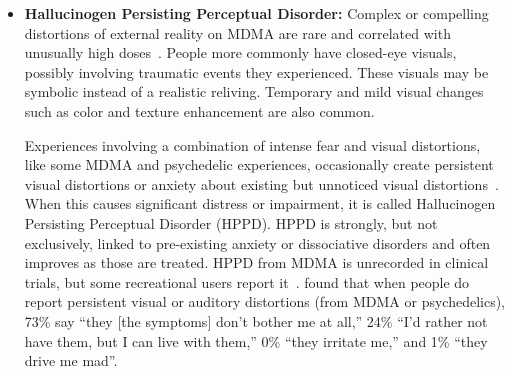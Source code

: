 \documentclass[11pt,oneside]{book}
\let\cite\parencite
\begin{document}
\begin{itemize}
    This suggests that the addictive potential of MDMA therapy is minimal for most people. If you are particularly worried about your potential for addiction or have significantly impaired impulse control, I suggest only doing MDMA therapy in structured, practitioner guided contexts. This might include people who have, or are in remission from, serious amphetamine or cocaine addictions who might find the stimulant effects of MDMA close enough to the effects of their abused drug.\footnote{The addiction pharmacology of these substances might share enough similarities with MDMA to warrant caution~\cite{nutt2015dopamine}. Other classes of addictive substances have different addiction pathways.}

    MDMA therapy has shown tentative promise for improving other addictions. Structured MDMA therapy with high levels of support was well tolerated in individuals with current mild alcohol addiction or early remission of moderate alcohol addiction and did not lead to increased alcohol intake~\cite{nicholasAlcohol}. People using MDMA therapy for recovery may be interested in \textcite{recoveryPsychedelics}, a 12-step program for integrating psychedelics into recovery.
    \item \textbf{Hallucinogen Persisting Perceptual Disorder:} Complex or compelling distortions of external reality on MDMA are rare and correlated with unusually high doses~\cite{liechtiGender}. People more commonly have closed-eye visuals, possibly involving traumatic events they experienced. These visuals may be symbolic instead of a realistic reliving. Temporary and mild visual changes such as color and texture enhancement are also common.

    Experiences involving a combination of intense fear and visual distortions, like some MDMA and psychedelic experiences, occasionally create persistent visual distortions or anxiety about existing but unnoticed visual distortions~\cite{halpernHPPD}. When this causes significant distress or impairment, it is called Hallucinogen Persisting Perceptual Disorder (HPPD). HPPD is strongly, but not exclusively, linked to pre-existing anxiety or dissociative disorders and often improves as those are treated. HPPD from MDMA is unrecorded in clinical trials, but some recreational users report it~\cite{vizeliActuteEffects,litjensHPPD}. \textcite[p. 289]{carhart2010user} found that when people do report persistent visual or auditory distortions (from MDMA or psychedelics), 73\% say \enquote{they [the symptoms] don't bother me at all,} 24\% \enquote{I'd rather not have them, but I can live with them,} 0\% \enquote{they irritate me,} and 1\% \enquote{they drive me mad}.


\end{itemize}
\end{document}
